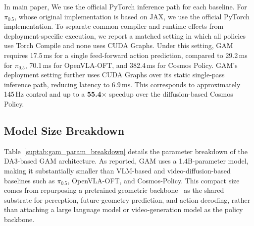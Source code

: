 \documentclass{llmxive}
\begin{document}
In main paper, We use the official PyTorch inference path for each baseline. For $\pi_{0.5}$, whose original implementation is based on JAX, we use the official PyTorch implementation. To separate common compiler and runtime effects from deployment-specific execution, we report a matched setting in which all policies use Torch Compile and none uses CUDA Graphs.
Under this setting, GAM requires 17.5\,ms for a single feed-forward action prediction, compared to 29.2\,ms for $\pi_{0.5}$, 70.1\,ms for OpenVLA-OFT, and 382.4\,ms for Cosmos Policy. 
GAM's deployment setting further uses CUDA Graphs over its static single-pass inference path, reducing latency to 6.9\,ms. This corresponds to approximately 145\,Hz control and up to a \textbf{55.4}$\times$ speedup over the diffusion-based Cosmos Policy.


\subsection{Model Size Breakdown}
\label{sec:appendix-params_breakdown}
\begin{table}[t]
\centering
{}
\caption{\textbf{Parameter breakdown of the DA3-based GAM model.}}
\label{suptab:gam_param_breakdown}
\end{table}
Table~\ref{suptab:gam_param_breakdown} details the parameter breakdown of the DA3-based GAM architecture. As reported, GAM uses a 1.4B-parameter model, making it substantially smaller than VLM-based and video-diffusion-based baselines such as $\pi_{0.5}$, OpenVLA-OFT, and Cosmos-Policy. This compact size comes from repurposing a pretrained geometric backbone~\cite{lin2025depth} as the shared substrate for perception, future-geometry prediction, and action decoding, rather than attaching a large language model or video-generation model as the policy backbone.
\end{document}
